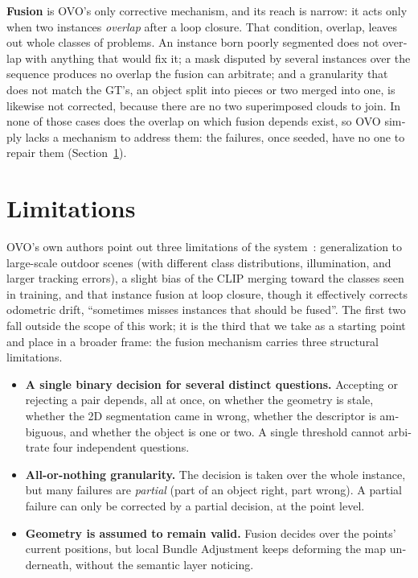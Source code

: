 \begin{otherlanguage}{english}
\textbf{Fusion} is OVO's only corrective mechanism, and its reach is narrow: it acts only when two
instances \emph{overlap} after a loop closure. That condition, overlap, leaves out whole classes of
problems. An instance born poorly segmented does not overlap with anything that would fix it; a mask
disputed by several instances over the sequence produces no overlap the fusion can arbitrate; and a
granularity that does not match the GT's, an object split into pieces or two merged into one, is
likewise not corrected, because there are no two superimposed clouds to join. In none of those cases
does the overlap on which fusion depends exist, so OVO simply lacks a mechanism to address them: the
failures, once seeded, have no one to repair them (Section~\ref{sec:ovo_limitations}).

\section{Limitations}
\label{sec:ovo_limitations}

OVO's own authors point out three limitations of the system~\parencite{berrielmartins2024ovo}:
generalization to large-scale outdoor scenes (with different class distributions, illumination, and
larger tracking errors), a slight bias of the CLIP merging toward the classes seen in training, and
that instance fusion at loop closure, though it effectively corrects odometric drift, \enquote{sometimes
misses instances that should be fused}. The first two fall outside the scope of this work; it is the
third that we take as a starting point and place in a broader frame: the fusion mechanism carries
three structural limitations.

\begin{itemize}
  \item \textbf{A single binary decision for several distinct questions.} Accepting or rejecting a
    pair depends, all at once, on whether the geometry is stale, whether the 2D segmentation came in
    wrong, whether the descriptor is ambiguous, and whether the object is one or two. A single
    threshold cannot arbitrate four independent questions.
  \item \textbf{All-or-nothing granularity.} The decision is taken over the whole instance, but many
    failures are \emph{partial} (part of an object right, part wrong). A partial failure can only be
    corrected by a partial decision, at the point level.
  \item \textbf{Geometry is assumed to remain valid.} Fusion decides over the points' current
    positions, but local Bundle Adjustment keeps deforming the map underneath, without the semantic
    layer noticing.
\end{itemize}


\end{otherlanguage}

